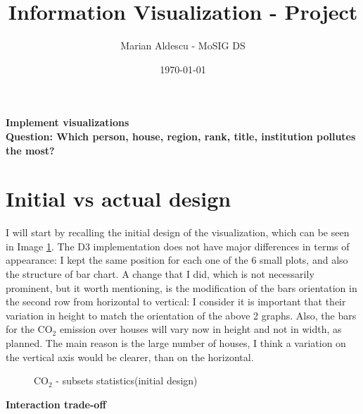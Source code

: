 \documentclass{article}
\title{Information Visualization - Project\vspace{-0.8em}}
\author{Marian Aldescu - MoSIG DS}
\date{\today}
\begin{document}
\maketitle



\textbf{\Large{Implement visualizations}}\\


\large{\textbf{Question: Which person, house, region, rank, title, institution pollutes the most?}}

\section{Initial vs actual design }
I will start by recalling the initial design of the visualization, which can be seen in Image \ref{fig:subsets}. The D3 implementation does not have major differences in terms of appearance: I kept the same position for each one of the 6 small plots, and also the structure of bar chart. A change that I did, which is not necessarily prominent, but it worth mentioning, is the modification of the bars orientation in the second row from horizontal to vertical: I consider it is important that their variation in height to match the orientation of the above 2 graphs. Also, the bars for the CO$_2$ emission over houses will vary now in height and not in width, as planned. The main reason is the large number of houses, I think a variation on the vertical axis would be clearer, than on the horizontal.

\begin{figure}[H]
	\centering
	\caption{CO${_2}$ - subsets statistics(initial design)}
	\label{fig:subsets}
\end{figure}

\large{\textbf{Interaction trade-off}}\\
\end{document}
